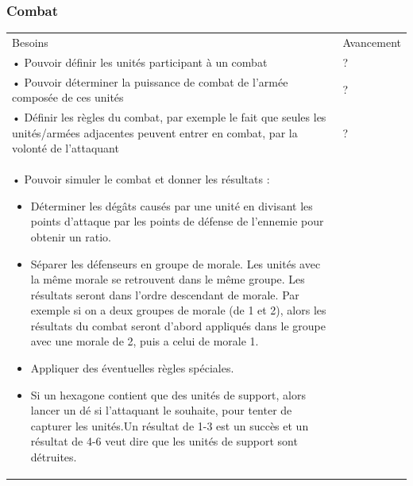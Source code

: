 \subsubsection{Combat}

\begin{center}
    \centering
    \begin{tabular}[h]{|m{14cm}|m{2cm}|}
        \hline
        \rowcolor[HTML]{FFA8A8}
        \multicolumn{2}{|c|}{\textbf{Priorité 3/3}}                                                                                                                                                   \\
        \hline
        Besoins                                                                                                                                                                          & Avancement \\
        \hline
        • Pouvoir définir les unités participant à un combat                                                                                                                             & ?          \\
        • Pouvoir déterminer la puissance de combat de l'armée composée de ces unités                                                                                                    & ?          \\
        • Définir les règles du combat, par exemple le fait que seules les unités/armées adjacentes peuvent entrer en combat, par la volonté de l'attaquant                              & ?          \\
        • Pouvoir simuler le combat et donner les résultats :
        \begin{itemize}
            \item Déterminer les dégâts causés par une unité en divisant les points d'attaque par les points de défense de l'ennemie pour obtenir un ratio.
            \item Séparer les défenseurs en groupe de morale. Les unités avec la même morale se retrouvent dans le même groupe. Les résultats seront dans l'ordre descendant de morale. Par exemple si on a deux groupes de morale (de 1 et 2), alors les résultats du combat seront d'abord appliqués dans le groupe avec une morale de 2, puis a celui de morale 1.
            \item Appliquer des éventuelles règles spéciales.
            \item Si un hexagone contient que des unités de support, alors lancer un dé si l'attaquant le souhaite, pour tenter de capturer les unités.\newline Un résultat de 1-3 est un succès et un résultat de 4-6 veut dire que les unités de support sont détruites.

\end{itemize}
\end{tabular}
\end{center}
